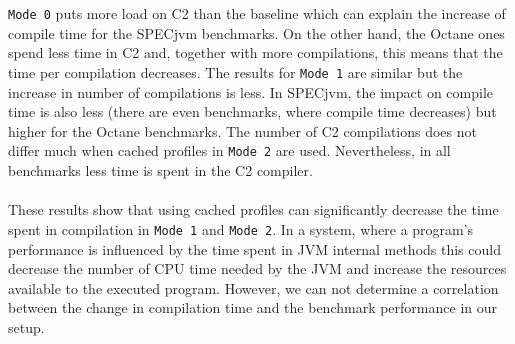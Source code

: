\\\\
\texttt{Mode 0} puts more load on C2 than the baseline which can explain the increase of compile time for the SPECjvm benchmarks. On the other hand, the Octane ones spend less time in C2 and, together with more compilations, this means that the time per compilation decreases. The results for \texttt{Mode 1} are similar but the increase in number of compilations is less. In SPECjvm, the impact on compile time is also less (there are even benchmarks, where compile time decreases) but higher for the Octane benchmarks. The number of C2 compilations does not differ much when cached profiles in \texttt{Mode 2} are used. Nevertheless, in all benchmarks less time is spent in the C2 compiler.
\\\\
These results show that using cached profiles can significantly decrease the time spent in compilation in \texttt{Mode 1} and \texttt{Mode 2}. In a system, where a program's performance is influenced by the time spent in JVM internal methods this could decrease the number of CPU time needed by the JVM and increase the resources available to the executed program. However, we can not determine a correlation between the change in compilation time and the benchmark performance in our setup.
\clearpage
